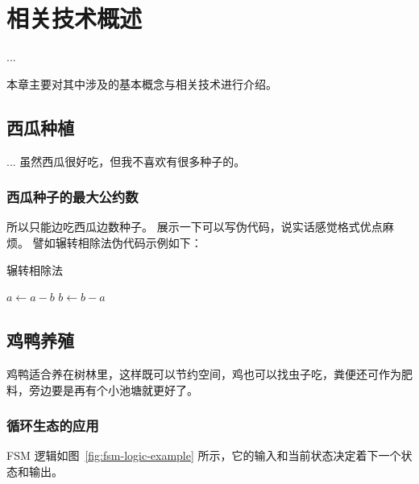 
\chapter{相关技术概述}

...

本章主要对其中涉及的基本概念与相关技术进行介绍。

\section{西瓜种植}

...
虽然西瓜很好吃，但我不喜欢有很多种子的。

\subsection{西瓜种子的最大公约数}

所以只能边吃西瓜边数种子。
展示一下可以写伪代码，说实话感觉格式优点麻烦。
譬如辗转相除法伪代码示例如下：

\begin{algorithm}
  \caption{辗转相除法}
  \label{alg1}
  \small
  \begin{algorithmic}
        \STATE $a \leftarrow a - b$
      \ELSE
        \STATE $b \leftarrow b - a$
      \ENDIF
    \ENDWHILE
  \end{algorithmic}
\end{algorithm}




\section{鸡鸭养殖}

鸡鸭适合养在树林里，这样既可以节约空间，鸡也可以找虫子吃，粪便还可作为肥料，旁边要是再有个小池塘就更好了。

\subsection{循环生态的应用}



FSM 逻辑如图~\ref{fig:fsm-logic-example} 所示，它的输入和当前状态决定着下一个状态和输出。

